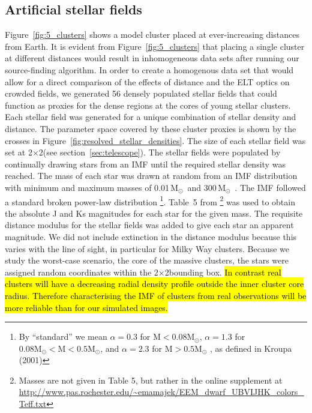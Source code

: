 \documentclass{aa}
\newcommand{\msun}{M$_\odot$~}
\begin{document}
\subsection{Artificial stellar fields}
  \label{subsec:stellar_fields}
Figure~\ref{fig:5_clusters} shows a model cluster placed at ever-increasing distances from Earth.
It is evident from Figure~\ref{fig:5_clusters} that placing a single cluster at different distances would result in inhomogeneous data sets after running our source-finding algorithm.
In order to create a homogenous data set that would allow for a direct comparison of the effects of distance and the ELT optics on crowded fields, we generated 56 densely populated stellar fields that could function as proxies for the dense regions at the cores of young stellar clusters.
Each stellar field was generated for a unique combination of stellar density and distance.
The parameter space covered by these cluster proxies is shown by the crosses in Figure~\ref{fig:resolved_stellar_densities}.
The size of each stellar field was set at 2\arcsec$\times$2\arcsec (see section~\ref{sec:telescope}).
The stellar fields were populated by continually drawing stars from an IMF until the required stellar density was reached.
The mass of each star was drawn at random from an IMF distribution with minimum and maximum masses of 0.01\,\msun and 300\,\msun.
The IMF followed a standard \citet{kroupa2001} broken power-law distribution
\footnote{By ``standard'' we mean $\alpha=0.3$ for $\mathrm{M} < 0.08 \mathrm{M}_\odot$, $\alpha=1.3$ for $0.08\mathrm{M}_\odot < \mathrm{M} < 0.5 \mathrm{M}_\odot$, and $\alpha=2.3$ for $\mathrm{M} > 0.5 \mathrm{M}_\odot$ , as defined in Kroupa (2001)}.
Table~5 from \citet{pecaut2013}\footnote{Masses are not given in Table 5, but rather in the online supplement at \url{http://www.pas.rochester.edu/~emamajek/EEM_dwarf_UBVIJHK_colors_Teff.txt}}
was used to obtain the absolute J and Ks magnitudes for each star for the given mass.
The requisite distance modulus for the stellar fields was added to give each star an apparent magnitude.
We did not include extinction in the distance modulus because this varies with the line of sight, in particular for Milky Way clusters.
Because we study the worst-case scenario, the core of the massive clusters, the stars were assigned random coordinates within the 2\arcsec$\times$2\arcsec bounding box.
\hl{In contrast real clusters will have a decreasing radial density profile outside the inner cluster core radius.
Therefore characterising the IMF of clusters from real observations will be more reliable than for our simulated images.}
\end{document}
